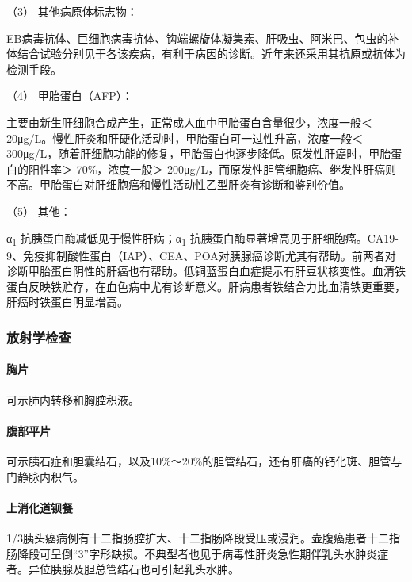 \hypertarget{text00039.htmlux5cux23CHP1-16-3-4-4-3}{}
（3） 其他病原体标志物：

EB病毒抗体、巨细胞病毒抗体、钩端螺旋体凝集素、肝吸虫、阿米巴、包虫的补体结合试验分别见于各该疾病，有利于病因的诊断。近年来还采用其抗原或抗体为检测手段。

\hypertarget{text00039.htmlux5cux23CHP1-16-3-4-4-4}{}
（4） 甲胎蛋白（AFP）：

主要由新生肝细胞合成产生，正常成人血中甲胎蛋白含量很少，浓度一般＜
20μg/L。慢性肝炎和肝硬化活动时，甲胎蛋白可一过性升高，浓度一般＜
300μg/L，随着肝细胞功能的修复，甲胎蛋白也逐步降低。原发性肝癌时，甲胎蛋白的阳性率＞
70\%，浓度一般＞
200μg/L，而原发性胆管细胞癌、继发性肝癌则不高。甲胎蛋白对肝细胞癌和慢性活动性乙型肝炎有诊断和鉴别价值。

\hypertarget{text00039.htmlux5cux23CHP1-16-3-4-4-5}{}
（5） 其他：

α\textsubscript{1} 抗胰蛋白酶减低见于慢性肝病；α\textsubscript{1}
抗胰蛋白酶显著增高见于肝细胞癌。CA19-9、免疫抑制酸性蛋白（IAP）、CEA、POA对胰腺癌诊断尤其有帮助。前两者对诊断甲胎蛋白阴性的肝癌也有帮助。低铜蓝蛋白血症提示有肝豆状核变性。血清铁蛋白反映铁贮存，在血色病中尤有诊断意义。肝病患者铁结合力比血清铁更重要，肝癌时铁蛋白明显增高。

\subsubsection{放射学检查}

\paragraph{胸片}

可示肺内转移和胸腔积液。

\paragraph{腹部平片}

可示胰石症和胆囊结石，以及10\%～20\%的胆管结石，还有肝癌的钙化斑、胆管与门静脉内积气。

\paragraph{上消化道钡餐}

1/3胰头癌病例有十二指肠腔扩大、十二指肠降段受压或浸润。壶腹癌患者十二指肠降段可呈倒“3”字形缺损。不典型者也见于病毒性肝炎急性期伴乳头水肿炎症者。异位胰腺及胆总管结石也可引起乳头水肿。

